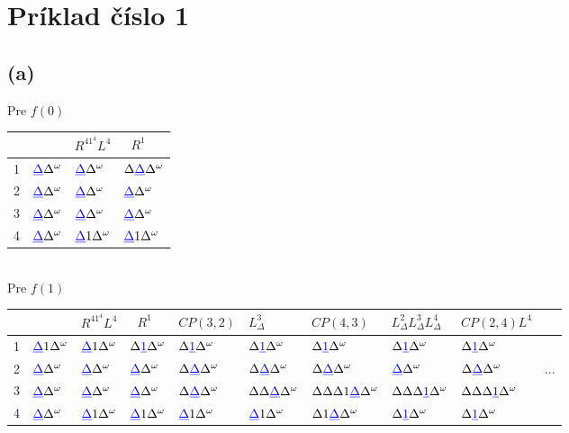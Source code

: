 \documentclass[11pt,a4paper]{article}
\newcommand{\blue}[1]{\textcolor{blue}{#1}}
\newcommand{\D}{\Delta}
\newcommand{\EOT}{\Delta^\omega} %
\newcommand{\UL}[1]{\blue{\underbar{$#1$}}} %
\begin{document}
\newpage
\section{Príklad číslo 1}

\subsection{(a)}

Pre $f(0)$\\[-0.5em]

\begin{tabular}{r|l|l|l}
    &                    & \tiny{$R^41^4L^4$}   & \tiny{$R^1$} \\\hline
  1 & $\UL{\D} \EOT$ & $\UL{\D} \EOT$   & $\D \UL{\D} \EOT$    \\
  2 & $\UL{\D} \EOT$ & $\UL{\D} \EOT$   & $\UL{\D} \EOT$       \\
  3 & $\UL{\D} \EOT$ & $\UL{\D} \EOT$   & $\UL{\D} \EOT$       \\
  4 & $\UL{\D} \EOT$ & $\UL{\D} 1 \EOT$ & $\UL{\D} 1 \EOT$     \\
\end{tabular}

\hfill\\[-1em]

Pre $f(1)$\\[-0.5em]

\begin{tabular}{r|l|l|l|l|l|l|l|l|l}
    &                  &\tiny{$R^41^4L^4$}& \tiny{$R^1$}     & \tiny{$CP(3,2)$}  & \tiny{$L^3_\D$}      & \tiny{$CP(4,3)$}          &\tiny{$L^2_\D L^3_\D L^4_\D$}& \tiny{$CP(2,4)L^4$}    & \\\hline
  1 & $\UL{\D} 1 \EOT$ & $\UL{\D} 1 \EOT$ & $\D \UL{1} \EOT$ & $\D \UL{1} \EOT$  & $\D \UL{1} \EOT$     & $\D \UL{1} \EOT$          & $\D \UL{1} \EOT$            & $\D \UL{1} \EOT$       & \\
  2 & $\UL{\D} \EOT$   & $\UL{\D} \EOT$   & $\UL{\D} \EOT$   & $\D \UL{\D} \EOT$ & $\D \UL{\D} \EOT$    & $\D \UL{\D} \EOT$         & $\UL{\D} \EOT$              & $\D \UL{\D} \EOT$      & ... \\
  3 & $\UL{\D} \EOT$   & $\UL{\D} \EOT$   & $\UL{\D} \EOT$   & $\D \UL{\D} \EOT$ & $\D \D \UL{\D} \EOT$ & $\D \D \D 1 \UL{\D} \EOT$ & $\D \D \D \UL{1} \EOT$      & $\D \D \D \UL{1} \EOT$ & \\
  4 & $\UL{\D} \EOT$   & $\UL{\D} 1 \EOT$ & $\UL{\D} 1 \EOT$ & $\UL{\D} 1 \EOT$  & $\UL{\D} 1 \EOT$     & $\D 1 \UL{\D} \EOT$       & $\D \UL{1} \EOT$            & $\D \UL{1} \EOT$       & \\
\end{tabular}
\end{document}
